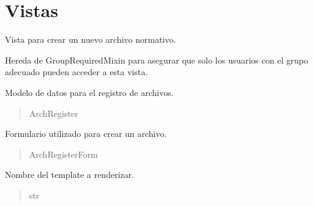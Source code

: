 \documentclass[letterpaper,10pt,spanish]{sphinxmanual}
\begin{document}
\section{Vistas}
\label{\detokenize{archivar:vistas}}

\begin{fulllineitems}

\pysigstartsignatures
{}
\pysigstopsignatures
\sphinxAtStartPar
Vista para crear un nuevo archivo normativo.

\sphinxAtStartPar
Hereda de GroupRequiredMixin para asegurar que solo los usuarios
con el grupo adecuado pueden acceder a esta vista.


\begin{fulllineitems}

\pysigstartsignatures
{}
\pysigstopsignatures
\sphinxAtStartPar
Modelo de datos para el registro de archivos.
\begin{quote}\begin{description}
\sphinxAtStartPar
ArchRegister

\end{description}\end{quote}

\end{fulllineitems}



\begin{fulllineitems}

\pysigstartsignatures
{}
\pysigstopsignatures
\sphinxAtStartPar
Formulario utilizado para crear un archivo.
\begin{quote}\begin{description}
\sphinxAtStartPar
ArchRegisterForm

\end{description}\end{quote}

\end{fulllineitems}



\begin{fulllineitems}

\pysigstartsignatures
{}
\pysigstopsignatures
\sphinxAtStartPar
Nombre del template a renderizar.
\begin{quote}\begin{description}
\sphinxAtStartPar
str


\end{description}
\end{quote}
\end{fulllineitems}
\end{fulllineitems}
\end{document}
